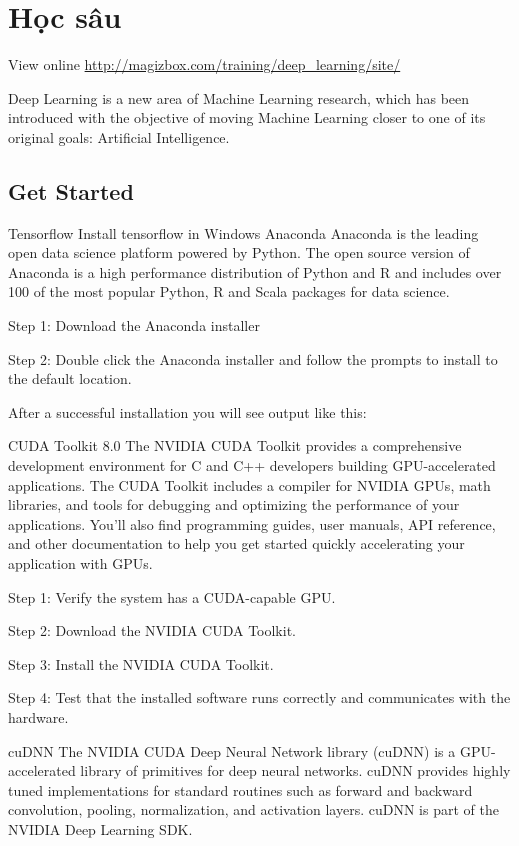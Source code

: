 \chapter{Học sâu}

View online \href{http://magizbox.com/training/deep_learning/site/}{http://magizbox.com/training/deep_learning/site/}

Deep Learning is a new area of Machine Learning research, which has been introduced with the objective of moving Machine Learning closer to one of its original goals: Artificial Intelligence.

\section{Get Started}

Tensorflow
Install tensorflow in Windows
Anaconda
Anaconda is the leading open data science platform powered by Python. The open source version of Anaconda is a high performance distribution of Python and R and includes over 100 of the most popular Python, R and Scala packages for data science.

Step 1: Download the Anaconda installer

Step 2: Double click the Anaconda installer and follow the prompts to install to the default location.

After a successful installation you will see output like this:



CUDA Toolkit 8.0
The NVIDIA CUDA Toolkit provides a comprehensive development environment for C and C++ developers building GPU-accelerated applications. The CUDA Toolkit includes a compiler for NVIDIA GPUs, math libraries, and tools for debugging and optimizing the performance of your applications. You’ll also find programming guides, user manuals, API reference, and other documentation to help you get started quickly accelerating your application with GPUs.

Step 1: Verify the system has a CUDA-capable GPU.

Step 2: Download the NVIDIA CUDA Toolkit.

Step 3: Install the NVIDIA CUDA Toolkit.

Step 4: Test that the installed software runs correctly and communicates with the hardware.



cuDNN
The NVIDIA CUDA Deep Neural Network library (cuDNN) is a GPU-accelerated library of primitives for deep neural networks. cuDNN provides highly tuned implementations for standard routines such as forward and backward convolution, pooling, normalization, and activation layers. cuDNN is part of the NVIDIA Deep Learning SDK.


